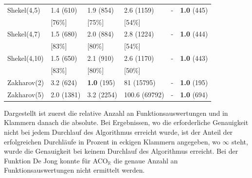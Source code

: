 \documentclass[fontsize=12, a4aper]{scrartcl}
\begin{document}
\begin{table}[H]
\begin{tabularx}{\linewidth}{ l X X X X X}
			Shekel(4,5) & 1.4 (610) & 1.9 (854) & 2.6 (1159) & - & \textbf{1.0} (445) \\
			
			 & [76\%] & [75\%] & [54\%] & & \\
			
			Shekel(4,7) & 1.5 (680) & 2.0 (884) & 2.8 (1224) & - & \textbf{1.0} (444) \\
			
			 & [83\%] & [80\%] & [54\%] & & \\
			
			Shekel(4,10) & 1.5 (650) & 2.1 (910) & 2.6 (1170) & - & \textbf{1.0} (443) \\
			
			 & [83\%] & [80\%] & [50\%] & & \\
			
			Zakharov(2) & 3.2 (624) & \textbf{1.0} (195) & 81 (15795) & - & \textbf{1.0} (195) \\
			
			Zakharov(5) & 2.0 (1381) & 3.2 (2254) & 100.6 (69792) & - & \textbf{1.0} (694)\\
			
			\bottomrule
			
		\end{tabularx}
		
		\smallskip
		
		Dargestellt ist zuerst die relative Anzahl an Funktionsauswertungen und in Klammern danach die absolute. Bei Ergebnissen, wo die erforderliche Genauigkeit nicht bei jedem Durchlauf des Algorithmus erreicht wurde, ist der Anteil der erfolgreichen Durchläufe in Prozent in eckigen Klammern angegeben, wo \(\infty\) steht, wurde die Genauigkeit bei keinem Durchlauf des Algorithmus erreicht. Bei der Funktion \glqq De Jong\grqq{} konnte für ACO\(_{\mathbb{R}}\) die genaue Anzahl an Funktionsauswertungen nicht ermittelt werden.\hfill\newline
		
	\end{table}
	
\end{document}
